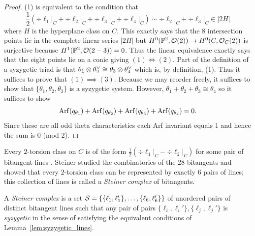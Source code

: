 \documentclass[main.tex]{subfiles}
\begin{document}
\begin{proof}
(1) is equivalent to the condition that
\[ \frac{1}{2} (\div{\ell_1|_C} + \div{\ell_2|_C} + \div{\ell_3|_C} + \div{\ell_4|_C}) \sim \div{\ell_2|_C} + \div{\ell_3|_C} \in |2 H|  \]
where $H$ is the hyperplane class on $C$. This exactly says that the $8$ intersection points lie in the complete linear series $|2H|$ but $H^0(\mathbb{P}^2, \mathcal{O}(2)) \to H^0(C, \mathcal{O}_C(2))$ is surjective because $H^1(\mathbb{P}^2, \mathcal{O}(2-3)) = 0$. Thus the linear equivalence exactly says that the eight points lie on a conic giving $(1) \iff (2)$. Part of the definition of a syzygetic triad is that $\theta_1 \otimes \theta_2^{\vee} \cong \theta_3 \otimes \theta_4^{\vee}$ which is, by definition, (1). Thus it suffices to prove that $(1) \implies (3)$. Because we may reorder freely, it suffices to show that $\{ \theta_1, \theta_2, \theta_3 \}$ is a syzygetic system. However, $\theta_1 + \theta_2 + \theta_3 \cong \theta_4$ so it suffices to show
\[ \operatorname{\mathrm{Arf}}(q_{\theta_1}) + \operatorname{\mathrm{Arf}}(q_{\theta_2}) + \operatorname{\mathrm{Arf}}(q_{\theta_3}) + \operatorname{\mathrm{Arf}}(q_{\theta_4}) = 0. \]
Since these are all odd theta characteristics each Arf invariant equals $1$ and hence the sum is $0$ (mod $2$). 
\end{proof}

Every $2$-torsion class on $C$ is of the form $\frac{1}{2} (\div{\ell_1|_C} - \div{\ell_2|_C})$ for some pair of bitangent lines \cite[Proposition~5.4.7]{dolgachev:classical_algebraic_geometry}. Steiner studied the combinatorics of the $28$ bitangents and showed that every $2$-torsion class can be represented by exactly $6$ pairs of lines; this collection of lines is called a \textit{Steiner complex} of bitangents.  

\begin{defn}
A \textit{Steiner complex} is a set $\mathcal{S} = \{ \{ \ell_1, \ell_1' \}, \dots, \{ \ell_6, \ell_6' \} \}$ of unordered pairs of distinct bitangent lines such that any pair of pairs $\{ \ell_i, \ell_i' \}, \{ \ell_j, \ell_j' \}$ is \textit{syzygetic} in the sense of satisfying the equivalent conditions of Lemma~\ref{lem:syzygetic_lines}.
\end{defn}
\end{document}
